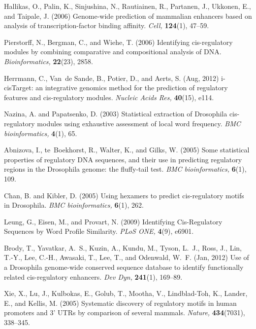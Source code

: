 \documentclass[a4,center,fleqn]{NAR}
\begin{document}
\begin{thebibliography}{10}
Hallikas, O., Palin, K., Sinjushina, N., Rautiainen, R., Partanen, J., Ukkonen,
  E., and Taipale, J. (2006)
{Genome-wide prediction of mammalian enhancers based on analysis of
  transcription-factor binding affinity}.
{\em Cell,} {\bf 124}(1), 47--59.

Pierstorff, N., Bergman, C., and Wiehe, T. (2006)
{Identifying cis-regulatory modules by combining comparative and compositional
  analysis of DNA}.
{\em Bioinformatics,} {\bf 22}(23), 2858.

Herrmann, C., Van~de Sande, B., Potier, D., and Aerts, S. (Aug, 2012)
i-cisTarget: an integrative genomics method for the prediction of regulatory
  features and cis-regulatory modules.
{\em Nucleic Acids Res,} {\bf 40}(15), e114.

Nazina, A. and Papatsenko, D. (2003)
{Statistical extraction of Drosophila cis-regulatory modules using exhaustive
  assessment of local word frequency}.
{\em BMC bioinformatics,} {\bf 4}(1), 65.

Abnizova, I., te~Boekhorst, R., Walter, K., and Gilks, W. (2005)
{Some statistical properties of regulatory DNA sequences, and their use in
  predicting regulatory regions in the Drosophila genome: the fluffy-tail
  test}.
{\em BMC bioinformatics,} {\bf 6}(1), 109.

Chan, B. and Kibler, D. (2005)
{Using hexamers to predict cis-regulatory motifs in Drosophila}.
{\em BMC bioinformatics,} {\bf 6}(1), 262.

Leung, G., Eisen, M., and Provart, N. (2009)
{Identifying Cis-Regulatory Sequences by Word Profile Similarity}.
{\em PLoS ONE,} {\bf 4}(9), e6901.

Brody, T., Yavatkar, A.~S., Kuzin, A., Kundu, M., Tyson, L.~J., Ross, J., Lin,
  T.-Y., Lee, C.-H., Awasaki, T., Lee, T., and Odenwald, W.~F. (Jan, 2012)
Use of a Drosophila genome-wide conserved sequence database to identify
  functionally related cis-regulatory enhancers.
{\em Dev Dyn,} {\bf 241}(1), 169--89.

Xie, X., Lu, J., Kulbokas, E., Golub, T., Mootha, V., Lindblad-Toh, K., Lander,
  E., and Kellis, M. (2005)
{Systematic discovery of regulatory motifs in human promoters and 3' UTRs by
  comparison of several mammals}.
{\em Nature,} {\bf 434}(7031), 338--345.


\end{thebibliography}
\end{document}

